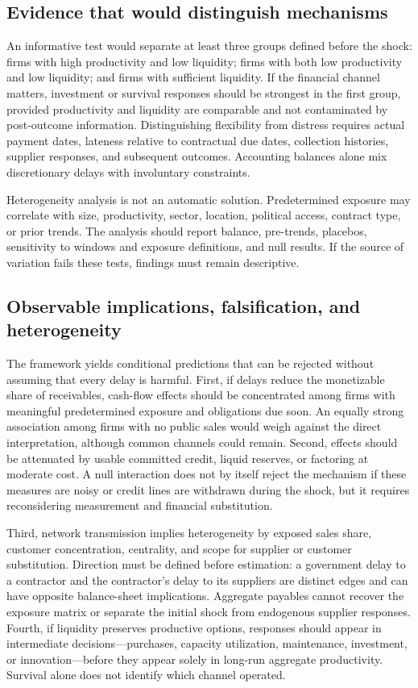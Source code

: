 \documentclass[11pt,a4paper]{article}
\begin{document}
\subsection{Evidence that would distinguish mechanisms}
An informative test would separate at least three groups defined before the shock: firms with high productivity and low liquidity; firms with both low productivity and low liquidity; and firms with sufficient liquidity. If the financial channel matters, investment or survival responses should be strongest in the first group, provided productivity and liquidity are comparable and not contaminated by post-outcome information. Distinguishing flexibility from distress requires actual payment dates, lateness relative to contractual due dates, collection histories, supplier responses, and subsequent outcomes. Accounting balances alone mix discretionary delays with involuntary constraints.

Heterogeneity analysis is not an automatic solution. Predetermined exposure may correlate with size, productivity, sector, location, political access, contract type, or prior trends. The analysis should report balance, pre-trends, placebos, sensitivity to windows and exposure definitions, and null results. If the source of variation fails these tests, findings must remain descriptive.

\subsection{Observable implications, falsification, and heterogeneity}
The framework yields conditional predictions that can be rejected without assuming that every delay is harmful. First, if delays reduce the monetizable share of receivables, cash-flow effects should be concentrated among firms with meaningful predetermined exposure and obligations due soon. An equally strong association among firms with no public sales would weigh against the direct interpretation, although common channels could remain. Second, effects should be attenuated by usable committed credit, liquid reserves, or factoring at moderate cost. A null interaction does not by itself reject the mechanism if these measures are noisy or credit lines are withdrawn during the shock, but it requires reconsidering measurement and financial substitution.

Third, network transmission implies heterogeneity by exposed sales share, customer concentration, centrality, and scope for supplier or customer substitution. Direction must be defined before estimation: a government delay to a contractor and the contractor's delay to its suppliers are distinct edges and can have opposite balance-sheet implications. Aggregate payables cannot recover the exposure matrix or separate the initial shock from endogenous supplier responses. Fourth, if liquidity preserves productive options, responses should appear in intermediate decisions—purchases, capacity utilization, maintenance, investment, or innovation—before they appear solely in long-run aggregate productivity. Survival alone does not identify which channel operated.
\end{document}
